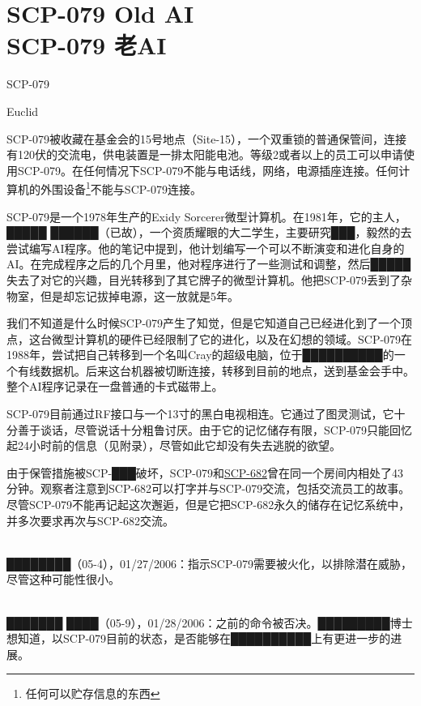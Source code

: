 \chapter[SCP-079 老AI]{
    SCP-079 Old AI\\
    SCP-079 老AI
}

\label{chap:SCP-079}

SCP-079

Euclid

SCP-079被收藏在基金会的15号地点（Site-15），一个双重锁的普通保管间，连接有120伏的交流电，供电装置是一排太阳能电池。等级2或者以上的员工可以申请使用SCP-079。在任何情况下SCP-079不能与电话线，网络，电源插座连接。任何计算机的外围设备\footnote{任何可以贮存信息的东西}不能与SCP-079连接。

SCP-079是一个1978年生产的Exidy Sorcerer微型计算机。在1981年，它的主人，█████ ██████（已故），一个资质耀眼的大二学生，主要研究███，毅然的去尝试编写AI程序。他的笔记中提到，他计划编写一个可以不断演变和进化自身的AI。在完成程序之后的几个月里，他对程序进行了一些测试和调整，然后█████失去了对它的兴趣，目光转移到了其它牌子的微型计算机。他把SCP-079丢到了杂物室，但是却忘记拔掉电源，这一放就是5年。

我们不知道是什么时候SCP-079产生了知觉，但是它知道自己已经进化到了一个顶点，这台微型计算机的硬件已经限制了它的进化，以及在幻想的领域。SCP-079在1988年，尝试把自己转移到一个名叫Cray的超级电脑，位于██████████的一个有线数据机。后来这台机器被切断连接，转移到目前的地点，送到基金会手中。整个AI程序记录在一盘普通的卡式磁带上。

SCP-079目前通过RF接口与一个13寸的黑白电视相连。它通过了图灵测试，它十分善于谈话，尽管说话十分粗鲁讨厌。由于它的记忆储存有限，SCP-079只能回忆起24小时前的信息（见附录），尽管如此它却没有失去逃脱的欲望。

由于保管措施被SCP-███破坏，SCP-079和\hyperref[chap:SCP-682]{SCP-682}曾在同一个房间内相处了43分钟。观察者注意到SCP-682可以打字并与SCP-079交流，包括交流员工的故事。尽管SCP-079不能再记起这次邂逅，但是它把SCP-682永久的储存在记忆系统中，并多次要求再次与SCP-682交流。

\\
████████（05-4），01\slash 27\slash 2006：指示SCP-079需要被火化，以排除潜在威胁，尽管这种可能性很小。

\\
███████ ████（05-9），01\slash 28\slash 2006：之前的命令被否决。█████████博士想知道，以SCP-079目前的状态，是否能够在██████████上有更进一步的进展。

